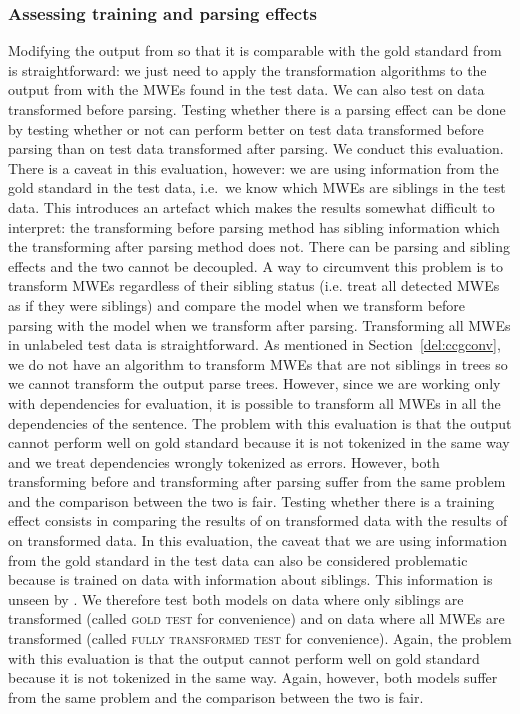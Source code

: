\documentclass[output=paper]{langsci/langscibook}
\begin{document}
    \subsubsection{Assessing training and parsing effects}
    \label{del:evalB}
    \indent Modifying the output from {\modelA} so that it is comparable with the gold standard from {\modelB} is straightforward: we just need to apply the transformation algorithms to the output from {\modelA} with the MWEs found in the test data. We can also test {\modelA} on data transformed before parsing.
    Testing whether there is a parsing effect can be done by testing whether or not {\modelA} can perform better on test data transformed before parsing than on test data transformed after parsing. We conduct this evaluation. There is a caveat in this evaluation, however: we are using information from the gold standard in the test data, i.e.\ we know which MWEs are siblings in the test data. This introduces an artefact which makes the results somewhat difficult to interpret: the transforming before parsing method has sibling information which the transforming after parsing method does not. There can be parsing and sibling effects and the two cannot be decoupled. A way to circumvent this problem is to transform MWEs regardless of their sibling status (i.e. treat all detected MWEs as if they were siblings) and compare the model when we transform before parsing with the model when we transform after parsing. Transforming all MWEs in unlabeled test data is straightforward. As mentioned in Section~\ref{del:ccgconv}, we do not have an algorithm to transform MWEs that are not siblings in trees so we cannot transform the output parse trees. However, since we are working only with dependencies for evaluation, it is possible to transform all MWEs in all the dependencies of the sentence. The problem with this evaluation is that the output cannot perform well on gold standard because it is not tokenized in the same way and we treat dependencies wrongly tokenized as errors. However, both transforming before and transforming after parsing suffer from the same problem and the comparison between the two is fair. 
    Testing whether there is a training effect consists in comparing the results of {\modelA} on transformed data with the results of {\modelB} on transformed data. In this evaluation, the caveat that we are using information from the gold standard in the test data can also be considered problematic because {\modelB} is trained on data with information about siblings. This information is unseen by {\modelA}. We therefore test both models on data where only siblings are transformed (called \textsc{gold test} for convenience) and on data where all MWEs are transformed (called \textsc{fully transformed test} for convenience). Again, the problem with this evaluation is that the output cannot perform well on gold standard because it is not tokenized in the same way. Again, however, both models suffer from the same problem and the comparison between the two is fair.
\end{document}
